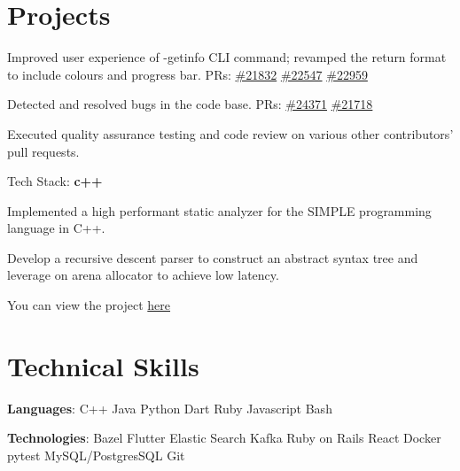 \documentclass[]{Klement_Resume}
\begin{document}
\begin{minipage}[t]{1\textwidth}
    \section{Projects}
    \begin{tightemize}
    \item Improved user experience of -getinfo CLI command; revamped the return format to include colours and progress bar. PRs: \href{https://github.com/bitcoin/bitcoin/pull/21832}{\#21832} \href{https://github.com/bitcoin/bitcoin/pull/22547}{\#22547} \href{https://github.com/bitcoin/bitcoin/pull/22959}{\#22959}
    \item Detected and resolved bugs in the code base. PRs: \href{https://github.com/bitcoin/bitcoin/pull/24371}{\#24371} \href{https://github.com/bitcoin/bitcoin/pull/21718}{\#21718}
    \item Executed quality assurance testing and code review on various other contributors' pull requests.
    \item Tech Stack: {\bf c++}
    \end{tightemize}
    \sectionsep

    \descript{  }
    \begin{tightemize}
      \item Implemented a high performant static analyzer for the SIMPLE programming language in C++.
      \item Develop a recursive descent parser to construct an abstract syntax tree and leverage on arena allocator to achieve low latency.
      \item You can view the project \href{https://github.com/klementtan/CS3203}{here}
    \end{tightemize}

    \sectionsep
  \section{Technical Skills} 
  \vspace{\topsep} %
  \begin{tightemize}
    \item {\bf Languages}: C++ \textbullet{} Java \textbullet{} Python \textbullet{} Dart \textbullet{} Ruby \textbullet{} Javascript \textbullet{} Bash
    \item {\bf Technologies}: Bazel \textbullet{} Flutter \textbullet{} Elastic Search \textbullet{} Kafka \textbullet{} Ruby on Rails \textbullet{} React \textbullet{} Docker \textbullet{} pytest \textbullet{} MySQL/PostgresSQL \textbullet{} Git
    \end{tightemize}

  \end{minipage} 
  
\end{document}
